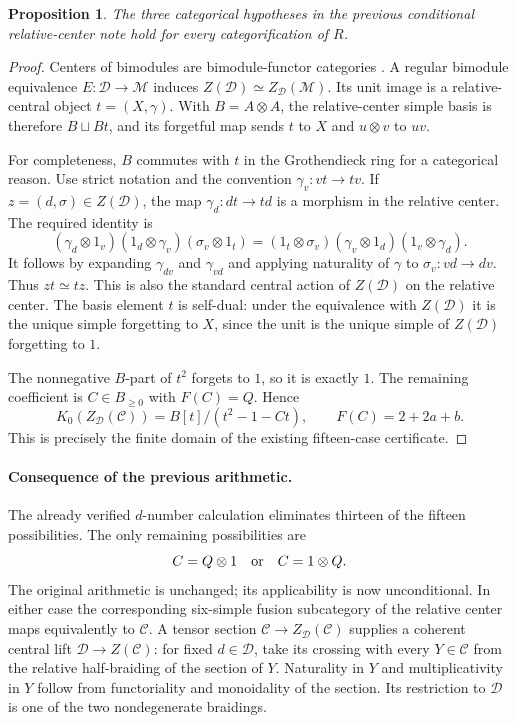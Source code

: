 \documentclass[11pt]{article}
\newtheorem{proposition}{Proposition}
\begin{document}
\begin{proposition}
The three categorical hypotheses in the previous conditional
relative-center note hold for every categorification of $R$.
\end{proposition}
\begin{proof}
Centers of bimodules are bimodule-functor categories
\cite[Definition 2.1]{GNN}. A regular bimodule equivalence
$E:\mathcal D\to\mathcal M$ induces
$Z(\mathcal D)\simeq Z_{\mathcal D}(\mathcal M)$.
Its unit image is a relative-central object $t=(X,\gamma)$.
With $B=A\otimes A$, the relative-center simple basis is therefore
$B\sqcup Bt$, and its forgetful map sends $t$ to $X$ and
$u\otimes v$ to $uv$.

For completeness, $B$ commutes with $t$ in the Grothendieck ring for a
categorical reason. Use strict notation and the convention
$\gamma_v:vt\to tv$. If $z=(d,\sigma)\in Z(\mathcal D)$, the map
$\gamma_d:dt\to td$ is a morphism in the relative center. The required
identity is
\[
 (\gamma_d\otimes1_v)(1_d\otimes\gamma_v)(\sigma_v\otimes1_t)
 =(1_t\otimes\sigma_v)(\gamma_v\otimes1_d)(1_v\otimes\gamma_d).
\]
It follows by expanding $\gamma_{dv}$ and $\gamma_{vd}$ and applying
naturality of $\gamma$ to $\sigma_v:vd\to dv$. Thus $zt\simeq tz$.
This is also the standard central action of $Z(\mathcal D)$ on the relative
center. The basis element $t$ is self-dual: under the equivalence with
$Z(\mathcal D)$ it is the unique simple forgetting to $X$, since the unit
is the unique simple of $Z(\mathcal D)$ forgetting to $1$.

The nonnegative $B$-part of $t^2$ forgets to $1$, so it is exactly $1$.
The remaining coefficient is $C\in B_{\geq0}$ with $F(C)=Q$. Hence
\[
 K_0(Z_{\mathcal D}(\mathcal C))
 =B[t]/(t^2-1-Ct),\qquad F(C)=2+2a+b.
\]
This is precisely the finite domain of the existing fifteen-case certificate.
\end{proof}

\paragraph{Consequence of the previous arithmetic.}
The already verified $d$-number calculation eliminates thirteen of the
fifteen possibilities. The only remaining possibilities are
\[
 C=Q\otimes1\quad\hbox{or}\quad C=1\otimes Q.
\]
The original arithmetic is unchanged; its applicability is now unconditional.
In either case the corresponding six-simple fusion subcategory of the
relative center maps equivalently to $\mathcal C$. A tensor section
$\mathcal C\to Z_{\mathcal D}(\mathcal C)$ supplies a coherent central
lift $\mathcal D\to Z(\mathcal C)$: for fixed $d\in\mathcal D$, take
its crossing with every $Y\in\mathcal C$ from the relative half-braiding
of the section of $Y$. Naturality in $Y$ and multiplicativity in $Y$ follow
from functoriality and monoidality of the section. Its restriction to
$\mathcal D$ is one of the two nondegenerate braidings.
\end{document}
